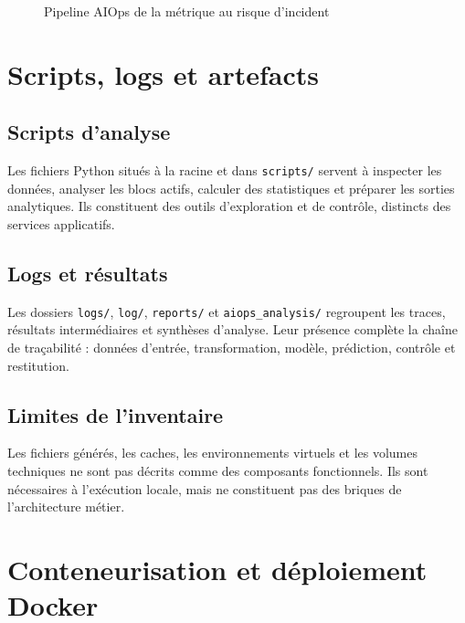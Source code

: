 \documentclass[11pt,a4paper]{report}
\begin{document}
\begin{figure}[H]
\centering
{}
\caption{Pipeline AIOps de la métrique au risque d’incident}
\end{figure}

\chapter{Scripts, logs et artefacts}
\section{Scripts d’analyse}
Les fichiers Python situés à la racine et dans \texttt{scripts/} servent à inspecter les données, analyser les blocs actifs, calculer des statistiques et préparer les sorties analytiques. Ils constituent des outils d’exploration et de contrôle, distincts des services applicatifs.

\section{Logs et résultats}
Les dossiers \texttt{logs/}, \texttt{log/}, \texttt{reports/} et \texttt{aiops\_analysis/} regroupent les traces, résultats intermédiaires et synthèses d’analyse. Leur présence complète la chaîne de traçabilité : données d’entrée, transformation, modèle, prédiction, contrôle et restitution.

\section{Limites de l’inventaire}
Les fichiers générés, les caches, les environnements virtuels et les volumes techniques ne sont pas décrits comme des composants fonctionnels. Ils sont nécessaires à l’exécution locale, mais ne constituent pas des briques de l’architecture métier.

\chapter{Conteneurisation et déploiement Docker}
\end{document}

